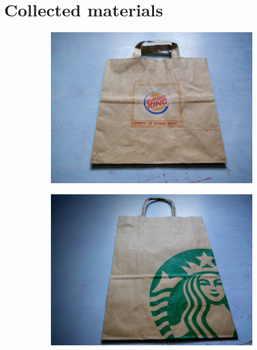 \appendix
\chapter{Collected materials}

\begin{figure}
    \centering
    \begin{subfigure}[t]{0.47\textwidth}
        \includegraphics[width=\textwidth]{project_graphics/collected1.jpg}
    \end{subfigure}
    \begin{subfigure}[t]{0.47\textwidth}
        \includegraphics[width=\textwidth]{project_graphics/collected2.jpg}
    \end{subfigure}
    \label{fig:CollectedMaterials1}
\end{figure}